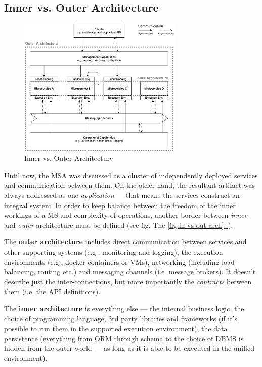 \documentclass[thesis=M,english,hidelinks]{FITthesis}[2012/10/20]
\newcommand*{\fullref}[1]{\hyperref[{#1}]{\autoref*{#1}: \textit{\nameref*{#1}}}}
\begin{document}
\subsection{Inner vs. Outer Architecture}

\begin{figure}
  \centering
    \includegraphics[width=0.7\textwidth]{images/architecture_inner_vs_outer.pdf}
    \caption{Inner vs. Outer Architecture}
  \label{fig:in-vs-out-arch}
\end{figure}

Until now, the \acrshort{MSA} was discussed as a cluster of independently deployed services and communication between them. On the other hand, the resultant artifact was always addressed as one \textit{application} --- that means the services construct an integral system. In order to keep balance between the freedom of the inner workings of a \acrshort{MS} and complexity of operations, another border between \textit{inner} and \textit{outer} architecture must be defined (see fig. The \fullref{fig:in-vs-out-arch}).

The \textbf{outer architecture} includes direct communication between services and other supporting systems (e.g., monitoring and logging), the execution environments (e.g., docker containers or \acrshort{VM}s), networking (including load-balancing, routing etc.) and messaging channels (i.e. message brokers). It doesn't describe just the inter-connections, but more importantly the \textit{contracts} between them (i.e. the \acrshort{API} definitions). 

The \textbf{inner architecture} is everything else --- the internal business logic, the choice of programming language, 3rd party libraries and frameworks (if it's possible to run them in the supported execution environment), the data persistence (everything from \acrshort{ORM} through schema to the choice of \acrshort{DBMS} is hidden from the outer world --- as long as it is able to be executed in the unified environment).
\end{document}
